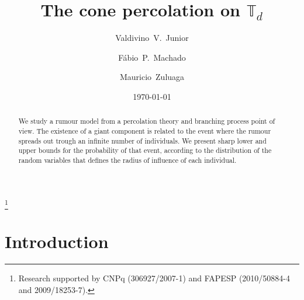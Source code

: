 \documentclass[12pt,reqno,oneside]{amsart}
\theoremstyle{plain}
\theoremstyle{definition}
\numberwithin{equation}{section}
\begin{document}
\baselineskip=26pt

\title{The cone percolation on ${{\mathbb T}}_d$}

\author{Valdivino~V.~Junior}
\author{F\'abio~P.~Machado}
\author{Mauricio~Zuluaga}

\address[F\'abio~P.~Machado]
{Institute of Mathematics and Statistics
\\ University of S\~ao Paulo \\ Rua do Mat\~ao 1010, CEP
05508-090, S\~ao Paulo, SP, Brazil.}

\address[Valdivino~V.~Junior]
{Federal University of Goias
\\ Campus Samambaia, CEP 74001-970, Goi\^ania, GO, Brazil.}

\address[Mauricio~Zuluaga]
{Department of Statistics, Federal University of Pernambuco
\\ Cidade Universit\'aria, CEP 50740-540, Recife, PE, Brazil.}

\noindent
{}

\thanks{Research supported by CNPq (306927/2007-1) and FAPESP (2010/50884-4 and 2009/18253-7).}



\date{\today}

\begin{abstract}
We study a rumour model from a percolation theory and branching process 
point of view. The existence of a giant component is related to the event
where the rumour spreads out trough an infinite number of individuals.
We present sharp lower and upper bounds for the
probability of that event, according to the distribution of the random variables 
that defines the radius of influence of each individual.
\end{abstract}

\maketitle

\section{Introduction}
\label{S: Introduction}
\end{document}
